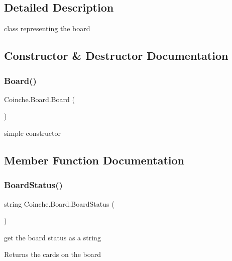 \subsection{Detailed Description}
class representing the board 



\subsection{Constructor \& Destructor Documentation}
\mbox{\label{class_coinche_1_1_board_a62235716a2f4c7726973aca20cd46fce}} 
\subsubsection{\texorpdfstring{Board()}{Board()}}
{\footnotesize\ttfamily Coinche.\+Board.\+Board (\begin{DoxyParamCaption}{ }\end{DoxyParamCaption})\hspace{0.3cm}{\ttfamily [inline]}}



simple constructor 



\subsection{Member Function Documentation}
\mbox{\label{class_coinche_1_1_board_ae95210444e9e18af75f0b55827842905}} 
\subsubsection{\texorpdfstring{Board\+Status()}{BoardStatus()}}
{\footnotesize\ttfamily string Coinche.\+Board.\+Board\+Status (\begin{DoxyParamCaption}{ }\end{DoxyParamCaption})\hspace{0.3cm}{\ttfamily [inline]}}



get the board status as a string 

\begin{DoxyReturn}{Returns}
the cards on the board
\end{DoxyReturn}
\mbox{\label{class_coinche_1_1_board_a9f83f16052be20631b1645edd53d8adb}} 
